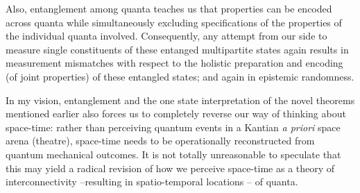 \documentclass[%
 superscriptaddress,
 preprint,
 showpacs,
 showkeys,
 nofootinbib,
  amsmath,amssymb,
  aps,
  longbibliography,
  floatfix,
 ]{revtex4-1}
\theoremstyle{definition}
\begin{document}
Also, entanglement among quanta teaches us that properties can be encoded across quanta
while simultaneously excluding specifications of the properties of the individual quanta involved.
Consequently, any attempt from our side to measure single constituents of
these entanged multipartite states again results in measurement mismatches with respect to the holistic preparation and encoding (of joint properties)
of these entangled states;
and again in epistemic randomness.

In my vision, entanglement
and the one state interpretation of the novel theorems mentioned earlier
also forces us to completely reverse our way of thinking about space-time: rather than perceiving quantum events in a Kantian {\it a priori}
space arena (theatre), space-time needs to be operationally reconstructed from quantum mechanical outcomes.
It is not totally unreasonable to speculate that this may yield a radical revision
of how we perceive space-time as a theory of interconnectivity --resulting in spatio-temporal locations -- of quanta.




\end{document}
